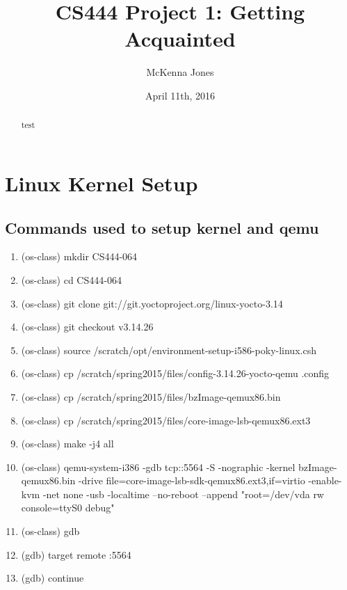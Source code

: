 \documentclass[letterpaper,10pt,titlepage,draftclsnofoot,onecolumn]{IEEEtran}
\title{CS444 Project 1: Getting Acquainted}
\author{McKenna Jones}
\date{April 11th, 2016}
\begin{document}
\begin{titlepage}


\maketitle
\begin{abstract}
test
\end{abstract}
\end{titlepage}
\section{Linux Kernel Setup}
\subsection{Commands used to setup kernel and qemu}
\begin{enumerate}
\item (os-class) mkdir CS444-064
\item (os-class) cd CS444-064
\item (os-class) git clone git://git.yoctoproject.org/linux-yocto-3.14
\item (os-class) git checkout v3.14.26
\item (os-class) source /scratch/opt/environment-setup-i586-poky-linux.csh
\item (os-class) cp /scratch/spring2015/files/config-3.14.26-yocto-qemu .config
\item (os-class) cp /scratch/spring2015/files/bzImage-qemux86.bin
\item (os-class) cp /scratch/spring2015/files/core-image-lsb-qemux86.ext3
\item (os-class) make -j4 all
\item (os-class) qemu-system-i386 -gdb tcp::5564 -S -nographic -kernel bzImage-qemux86.bin -drive file=core-image-lsb-sdk-qemux86.ext3,if=virtio -enable-kvm -net none -usb -localtime --no-reboot --append "root=/dev/vda rw console=ttyS0 debug"
\item (os-class) gdb
\item (gdb) target remote :5564
\item (gdb) continue
\end{enumerate}
\end{document}
